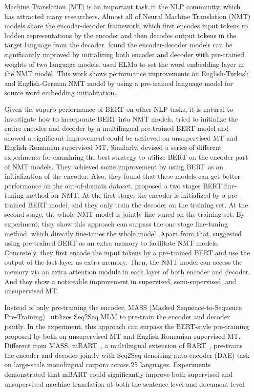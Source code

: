 \documentclass[fleqn]{SCYE-arxiv}
\begin{document}
\begin{multicols}{2}
Machine Translation (MT) is an important task in the NLP community, which has attracted many researchers. Almost all of Neural Machine Translation (NMT) models share the encoder-decoder framework, which first encodes input tokens to hidden representations
by the encoder and then decodes output tokens in the target language from the decoder.
\citet{ramachandran2017unsupervised} found the encoder-decoder models can be significantly improved by initializing both encoder and decoder with pre-trained weights of two language models. \citet{DBLP:conf/naacl/EdunovBA19} used ELMo to set the word embedding layer in the NMT  model. This work shows performance improvements on English-Turkish and English-German NMT model by using a pre-trained language model for source word embedding initialization.

Given the superb performance of BERT on other NLP tasks, it is natural to investigate how to incorporate BERT into NMT models.
\citet{DBLP:conf/nips/ConneauL19} tried to initialize the entire encoder and decoder by a  multilingual pre-trained BERT model and showed a significant improvement could be achieved on unsupervised  MT and English-Romanian supervised MT. Similarly, \citet{clinchant-etal-2019-use} devised a series of different experiments for examining the best strategy to utilize BERT on the encoder part of NMT models. They achieved some improvement by using BERT as an initialization of the encoder. Also, they found that these models can get better performance on the out-of-domain dataset. \citet{imamura-sumita-2019-recycling} proposed a two stages BERT fine-tuning method for NMT. At the first stage, the encoder is initialized by a pre-trained BERT model, and they only train the decoder on the training set. At the second stage, the whole NMT model is jointly fine-tuned on the training set. By experiment, they show this approach can surpass the one stage fine-tuning method, which directly fine-tunes the whole model. Apart from that, \citet{Zhu2020Incorporating} suggested using pre-trained BERT as an extra memory to facilitate NMT models. Concretely, they first encode the input tokens by a pre-trained BERT and use the output of the last layer as extra memory. Then, the NMT model can access the memory via an extra attention module in each layer of both encoder and decoder. And they show a noticeable improvement in supervised, semi-supervised, and unsupervised MT.

Instead of only pre-training the encoder, MASS (Masked Sequence-to-Sequence Pre-Training)~\cite{DBLP:conf/icml/SongTQLL19} utilizes Seq2Seq MLM to pre-train the encoder and decoder jointly. In the experiment, this approach can surpass the BERT-style pre-training proposed by \citet{DBLP:conf/nips/ConneauL19} both on unsupervised MT and English-Romanian supervised MT.
Different from MASS, mBART~\cite{liu2020multilingual}, a multilingual extension of BART~\cite{lewis2019bart}, pre-trains the encoder and decoder jointly with Seq2Seq denoising auto-encoder (DAE) task on large-scale monolingual corpora across 25 languages. Experiments demonstrated that mBART could significantly improve both supervised and unsupervised machine translation at
both the sentence level and document level.


\end{multicols}
\end{document}

